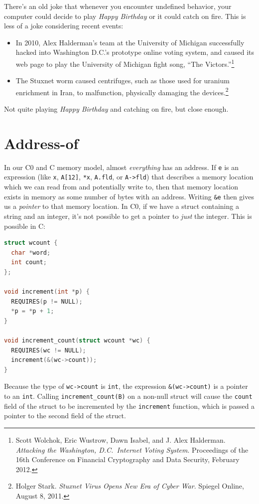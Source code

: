 There's an old joke that
whenever you encounter undefined behavior, your computer could decide
to play \emph{Happy Birthday} or it could catch on fire. This is less
of a joke considering recent events:
\begin{itemize}
\item%
  In 2010, Alex Halderman's team at the University of Michigan successfully
  hacked into Washington D.C.'s prototype online voting system, and caused its
  web page to play the University of Michigan fight song, ``The
  Victors.''\footnote{Scott Wolchok, Eric Wustrow, Dawn Isabel, and J. Alex
    Halderman. \emph{Attacking the Washington, D.C.~Internet Voting System}.
    Proceedings of the 16th Conference on Financial Cryptography and Data
    Security, February 2012.}
\item%
  The Stuxnet worm caused centrifuges, such as those used for uranium
  enrichment in Iran, to malfunction, physically damaging the
  devices.\footnote{Holger Stark. \emph{Stuxnet Virus Opens New Era of Cyber
      War}. Spiegel Online, August 8, 2011.}
\end{itemize}
Not quite playing \emph{Happy Birthday} and catching on fire, but close
enough.

\section{Address-of}
\label{sec:mem:address_of}

In our C0 and C memory model, almost \emph{everything} has an
address. If \lstinline'e' is an expression (like \lstinline'x',
\lstinline'A[12]', \lstinline'*x', \lstinline'A.fld', or
\lstinline'A->fld') that describes a memory location which we can read
from and potentially write to, then that memory location exists in
memory as some number of bytes with an address.  Writing
\lstinline'&e' then gives us a \emph{pointer} to that memory
location. In C0, if we have a struct containing a string and an
integer, it's not possible to get a pointer to \emph{just} the
integer. This is possible in C:
\begin{lstlisting}[language=c]
struct wcount {
  char *word;
  int count;
};

void increment(int *p) {
  REQUIRES(p != NULL);
  *p = *p + 1;
}

void increment_count(struct wcount *wc) {
  REQUIRES(wc != NULL);
  increment(&(wc->count));
}
\end{lstlisting}
Because the type of \lstinline'wc->count' is \lstinline'int', the expression
\lstinline'&(wc->count)' is a pointer to an \lstinline'int'.  Calling
\lstinline'increment_count(B)' on a non-null struct will cause the
\lstinline'count' field of the struct to be incremented by the
\lstinline'increment' function, which is passed a pointer to the second
field of the struct.

